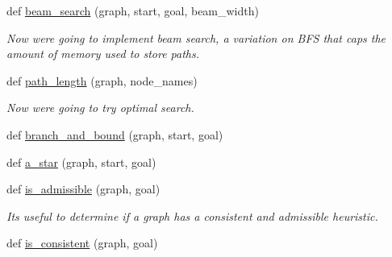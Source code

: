 \begin{DoxyCompactItemize}
def \hyperlink{namespacelab2_a6e27047ed6d844e2e8dc9ed3d1571473}{beam\+\_\+search} (graph, start, goal, beam\+\_\+width)
\begin{DoxyCompactList}\small\item\em Now we\textquotesingle{}re going to implement beam search, a variation on B\+F\+S that caps the amount of memory used to store paths. \end{DoxyCompactList}\item 
def \hyperlink{namespacelab2_a9124033f320681f2240efa74a9961c48}{path\+\_\+length} (graph, node\+\_\+names)
\begin{DoxyCompactList}\small\item\em Now we\textquotesingle{}re going to try optimal search. \end{DoxyCompactList}\item 
def \hyperlink{namespacelab2_a3723e90643162dc478de991430d9d51a}{branch\+\_\+and\+\_\+bound} (graph, start, goal)
\item 
def \hyperlink{namespacelab2_a1726fe9f0f3452bc927a9e54bc5bbdfa}{a\+\_\+star} (graph, start, goal)
\item 
def \hyperlink{namespacelab2_a2ed8d798792ec9dc5671acfe1bdf7a78}{is\+\_\+admissible} (graph, goal)
\begin{DoxyCompactList}\small\item\em It\textquotesingle{}s useful to determine if a graph has a consistent and admissible heuristic. \end{DoxyCompactList}\item 
def \hyperlink{namespacelab2_a8d80dde2701b05918676e6e47e89aad1}{is\+\_\+consistent} (graph, goal)
\end{DoxyCompactItemize}
